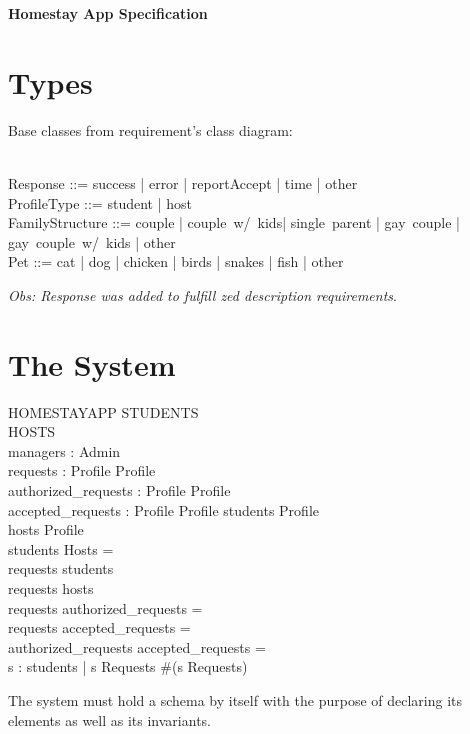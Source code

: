 \documentclass[11pt]{article}
\begin{document}
\begin{center}\LARGE
	\textbf{Homestay App Specification}
\end{center}

\section*{Types}
Base classes from requirement's class diagram:
\begin{zed}
\\
Response ::= success | error | reportAccept | time | other\\
ProfileType ::= student | host\\
FamilyStructure ::= couple | couple\ w/\ kids| single\ parent | gay\ couple | gay\ couple\ w/\ kids | other\\
Pet ::= cat | dog | chicken | birds | snakes | fish | other\\
\end{zed}
\emph{Obs: Response was added to fulfill zed description requirements}.


\section*{The System}
\begin{schema}{HOMESTAYAPP}
	\Xi STUDENTS\\
	\Xi HOSTS\\
	managers : \power Admin\\
	requests : Profile \rightarrow Profile\\
	authorized\_requests : Profile \rightarrow Profile\\
	accepted\_requests : Profile \rightarrow Profile
\where
	students \subseteq Profile\\
	hosts \subseteq Profile\\
	students \cap Hosts = \emptyset\\
	\dom requests \subset students\\
	\ran requests \subset hosts\\
	requests \cap authorized\_requests = \emptyset\\
	requests \cap accepted\_requests = \emptyset\\
	authorized\_requests \cap accepted\_requests = \emptyset\\
	\forall s : students | s \in \dom Requests \bullet \#(s \dres Requests) 
\end{schema}
The system must hold a schema by itself with the purpose of declaring its elements as well as its invariants.
\end{document}
